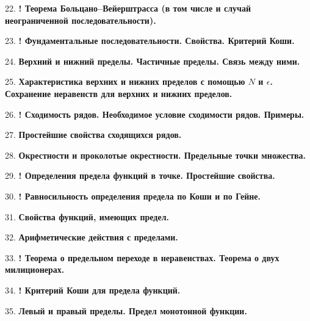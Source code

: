 \documentclass[12pt]{article}
\begin{document}
22. \textbf{! Теорема Больцано–Вейерштрасса (в том числе и случай неограниченной последовательности).}

23. \textbf{! Фундаментальные последовательности. Свойства. Критерий Коши.}

24. \textbf{Верхний и нижний пределы. Частичные пределы. Связь между ними.}

25. \textbf{Характеристика верхних и нижних пределов с помощью $N$ и $\epsilon$. Сохранение неравенств для верхних и нижних пределов.}

26. \textbf{! Сходимость рядов. Необходимое условие сходимости рядов. Примеры.}

27. \textbf{Простейшие свойства сходящихся рядов.}

28. \textbf{Окрестности и проколотые окрестности. Предельные точки множества.}

29. \textbf{! Определения предела функций в точке. Простейшие свойства.}

30. \textbf{! Равносильность определения предела по Коши и по Гейне.}

31. \textbf{Свойства функций, имеющих предел.}

32. \textbf{Арифметические действия с пределами.}

33. \textbf{! Теорема о предельном переходе в неравенствах. Теорема о двух милиционерах.}

34. \textbf{! Критерий Коши для предела функций.}

35. \textbf{Левый и правый пределы. Предел монотонной функции.}
\end{document}
